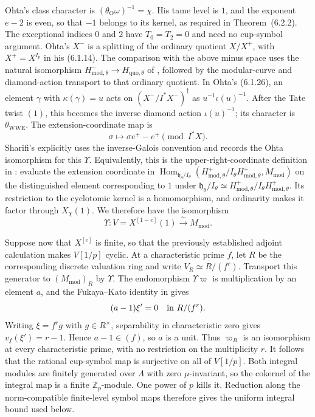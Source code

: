 \documentclass[11pt]{article}
\theoremstyle{definition}\newtheorem{definition}[theorem]{Definition}
\begin{document}
Ohta's class character is
$(\theta_{\mathrm O}\omega)^{-1}=\chi$.  His tame level is $1$,
and the exponent $e-2$ is even, so that $-1$ belongs to its kernel,
as required in Theorem~(6.2.2).  The exceptional indices $0$ and $2$
have $T_0=T_2=0$ and need no cup-symbol argument.  Ohta's $X^-$ is a
splitting of the ordinary quotient $X/X^+$, with $X^+=X^{I_p}$
in his (6.1.14).  The comparison with the above minus space uses the
natural isomorphism $H^-_{\mathrm{mod},\theta}\to H_{\mathrm{quo},\theta}$
of \cite[Theorem~3.4.1 and Corollary~3.4.2]{WWEPseudo}, followed by the
modular-curve and diamond-action transport to that ordinary quotient.
In Ohta's (6.1.26), an element $\gamma$ with $\kappa(\gamma)=u$ acts on
$(X^-/I^*X^-)^\dagger$ as $u^{-1}\iota(u)^{-1}$.  After the Tate twist $(1)$,
this becomes the inverse diamond action $\iota(u)^{-1}$; its character
is $\theta_{\mathrm{WWE}}$.  The extension-coordinate map is
\[
 \sigma\longmapsto \sigma e^+-e^+\pmod{I^*X}.
\]
Sharifi's \cite[pp.~3 and 13--14]{SharifiProgram} explicitly uses the inverse-Galois convention and records the
Ohta isomorphism for this $\Upsilon$.  Equivalently, this is the
upper-right-coordinate definition in \cite[\S8.1]{WWEPseudo}:
evaluate the extension coordinate in
$\operatorname{Hom}_{\mathfrak h_\theta/I_\theta}
 (H^+_{\mathrm{mod},\theta}/I_\theta H^+_{\mathrm{mod},\theta},
 M_{\mathrm{mod}})$ on the distinguished element corresponding to
$1$ under $\mathfrak h_\theta/I_\theta\simeq
H^+_{\mathrm{mod},\theta}/I_\theta H^+_{\mathrm{mod},\theta}$.
Its restriction to the cyclotomic kernel is a homomorphism, and
ordinarity makes it factor through $X_\chi(1)$.
We therefore have the isomorphism
\[
 \Upsilon: V=X^{[1-e]}(1)\xrightarrow{\ \sim\ }M_{\mathrm{mod}}.
\]

Suppose now that $X^{[e]}$ is finite, so that the previously established
adjoint calculation makes $V[1/p]$ cyclic.  At a characteristic prime
$f$, let $R$ be the corresponding discrete valuation ring and write
$V_R\simeq R/(f^r)$.  Transport this generator to
$(M_{\mathrm{mod}})_R$ by $\Upsilon$.
The endomorphism $\Upsilon\varpi$ is multiplication by an element $a$,
and the Fukaya--Kato identity in
\cite[Theorem~5.21]{SharifiFK} gives
\[
 (a-1)\xi'=0\quad\hbox{in }R/(f^r).
\]
Writing $\xi=f^r g$ with $g\in R^\times$, separability in
characteristic zero gives $v_f(\xi')=r-1$.  Hence $a-1\in(f)$,
so $a$ is a unit.  Thus $\varpi_R$ is an isomorphism at every
characteristic prime, with no restriction on the multiplicity $r$.
It follows that the rational cup-symbol map is surjective on all of
$V[1/p]$. Both integral modules are finitely generated over $\Lambda$
with zero $\mu$-invariant, so the cokernel of the integral map
is a finite $\mathbb Z_p$-module. One power of $p$ kills it.
Reduction along the norm-compatible finite-level symbol maps
therefore gives the uniform integral bound used below.
\end{document}
